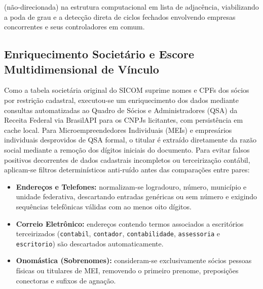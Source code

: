 (não-direcionada) na estrutura computacional em lista de adjacência, viabilizando a poda de grau e a detecção direta de ciclos fechados envolvendo empresas concorrentes e seus controladores em comum.

\subsection{Enriquecimento Societário e Escore Multidimensional de Vínculo} 

Como a tabela societária original do SICOM suprime nomes e CPFs dos sócios por restrição cadastral, executou-se um enriquecimento dos dados mediante consultas automatizadas ao Quadro de Sócios e Administradores (QSA) da Receita Federal via BrasilAPI para os CNPJs licitantes, com persistência em cache local. Para Microempreendedores Individuais (MEIs) e empresários individuais desprovidos de QSA formal, o titular é extraído diretamente da razão social mediante a remoção dos dígitos iniciais do documento. Para evitar falsos positivos decorrentes de dados cadastrais incompletos ou terceirização contábil, aplicam-se filtros determinísticos anti-ruído antes das comparações entre pares: 
\begin{itemize} 
  \item \textbf{Endereços e Telefones:} normalizam-se logradouro, número, município e unidade federativa, descartando entradas genéricas ou sem número e exigindo sequências telefônicas válidas com ao menos oito dígitos. \item \textbf{Correio Eletrônico:} endereços contendo termos associados a escritórios terceirizados (\texttt{contabil}, \texttt{contador}, \texttt{contabilidade}, \texttt{assessoria} e \texttt{escritorio}) são descartados automaticamente. 
  \item \textbf{Onomástica (Sobrenomes):} consideram-se exclusivamente sócios pessoas físicas ou titulares de MEI, removendo o primeiro prenome, preposições conectoras e sufixos de agnação. 
\end{itemize} 
